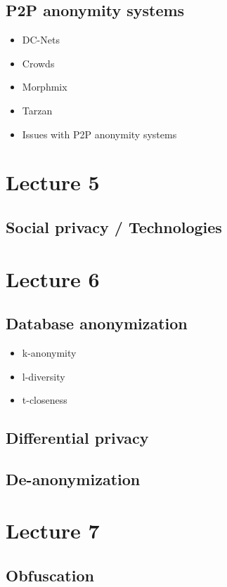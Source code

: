 \documentclass[a4paper,12pt,english]{article}
\begin{document}
\subsection{P2P anonymity systems}
\begin{itemize}
	\item DC-Nets
	\item Crowds
	\item Morphmix
	\item Tarzan
	\item Issues with P2P anonymity systems
\end{itemize}

\section{Lecture 5}
\subsection{Social privacy / Technologies}

\section{Lecture 6}
\subsection{Database anonymization}
\begin{itemize}
	\item k-anonymity
	\item l-diversity
	\item t-closeness
\end{itemize}

\subsection{Differential privacy}

\subsection{De-anonymization}

\section{Lecture 7}
\subsection{Obfuscation}
\end{document}
